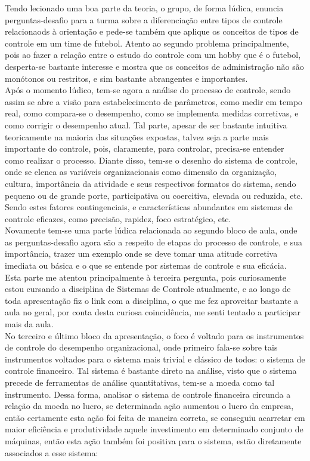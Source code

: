 \documentclass[oneside]{book}
\newcommand\tab[1][1cm]{\hspace*{#1}}
\theoremstyle{definition}
\begin{document}
            \tab Tendo lecionado uma boa parte da teoria, o grupo, de forma lúdica, enuncia perguntas-desafio para a turma sobre a diferenciação entre tipos de controle relacionaods à orientação e pede-se também que aplique os conceitos de tipos de controle em um time de futebol. Atento ao segundo problema principalmente, pois ao fazer a relação entre o estudo do controle com um hobby que é o futebol, desperta-se bastante interesse e mostra que os conceitos de administração não são monótonos ou restritos, e sim bastante abrangentes e importantes. \\
            \tab Após o momento lúdico, tem-se agora a análise do processo de controle, sendo assim se abre a visão para estabelecimento de parâmetros, como medir em tempo real, como compara-se o desempenho, como se implementa medidas corretivas, e como corrigir o desempenho atual. Tal parte, apesar de ser bastante intuitiva teoricamente na maioria das situações expostas, talvez seja a parte mais importante do controle, pois, claramente, para controlar, precisa-se entender como realizar o processo. Diante disso, tem-se o desenho do sistema de controle, onde se elenca as variáveis organizacionais como dimensão da organização, cultura, importância da atividade e seus respectivos formatos do sistema, sendo pequeno ou de grande porte, participativa ou coercitiva, elevada ou reduzida, etc. Sendo estes fatores contingenciais, e características abundantes em sistemas de controle eficazes, como precisão, rapidez, foco estratégico, etc.\\
            \tab Novamente tem-se uma parte lúdica relacionada ao segundo bloco de aula, onde as perguntas-desafio agora são a respeito de etapas do processo de controle, e sua importância, trazer um exemplo onde se deve tomar uma atitude corretiva imediata ou básica e o que se entende por sistemas de controle e sua eficácia. Esta parte me atentou principalmente à terceira pergunta, pois curiosamente estou cursando a disciplina de Sistemas de Controle atualmente, e ao longo de toda apresentação fiz o link com a disciplina, o que me fez aproveitar bastante a aula no geral, por conta desta curiosa coincidência, me senti tentado a participar mais da aula.\\
            \tab No terceiro e último bloco da apresentação, o foco é voltado para os instrumentos de controle do desempenho organizacional, onde primeiro fala-se sobre tais instrumentos voltados para o sistema mais trivial e clássico de todos: o sistema de controle financeiro. Tal sistema é bastante direto na análise, visto que o sistema precede de ferramentas de análise quantitativas, tem-se a moeda como tal instrumento. Dessa forma, analisar o sistema de controle financeira circunda a relação da moeda no lucro, se determinada ação aumentou o lucro da empresa, então certamente esta ação foi feita de maneira correta, se conseguiu acarretar em maior eficiência e produtividade aquele investimento em determinado conjunto de máquinas, então esta ação também foi positiva para o sistema, estão diretamente associados a esse sistema:
\end{document}
